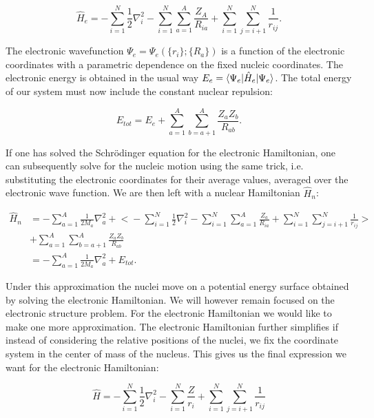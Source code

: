 \begin{equation}
    \hat{H}_e = -\sum_{i=1}^N \frac{1}{2} \nabla_i^2
    -\sum_{i=1}^N \sum_{a=1}^A \frac{Z_A}{R_{ia}}
    +\sum_{i=1}^N \sum_{j=i+1}^N \frac{1}{r_{ij}} .
\end{equation}

The electronic wavefunction $\Psi_e = \Psi_e(\{r_i\}; \{R_a\})$
is a function of the electronic coordinates with a parametric dependence
on the fixed nucleic coordinates. The electronic energy
is obtained in the usual way $E_{e} = \braket{\Psi_e | \hat{H}_e |
\Psi_e} $. The total energy of our system
must now include the constant nuclear repulsion:

\begin{equation}
 E_{tot} = E_{e} + \sum_{a=1}^A \sum_{b=a+1}^A
    \frac{Z_a Z_b}{R_{ab}} . 
\end{equation}

If one has solved the Schr\"{o}dinger equation for the electronic
Hamiltonian, one can subsequently solve for the nucleic motion
using the same trick, i.e. substituting the electronic coordinates
for their average values, averaged over the electronic wave function.
We are then left with a nuclear Hamiltonian $\hat{H}_n$:

\begin{equation}
    \begin{split}
        \hat{H}_n
        &= -\sum_{a=1}^A \frac{1}{2 M_a} \nabla_a^2
        + \biggl< -\sum_{i=1}^N \frac{1}{2} \nabla_i^2
        - \sum_{i=1}^N \sum_{a=1}^A \frac{Z_a}{R_{ia}}
        + \sum_{i=1}^N \sum_{j=i+1}^N \frac{1}{r_{ij}}
        \biggr> \\
        &+ \sum_{a=1}^A \sum_{b=a+1}^A
        \frac{Z_a Z_b}{R_{ab}} \\
        &= -\sum_{a=1}^A \frac{1}{2 M_a} \nabla_a^2
        + E_{tot} .
    \end{split}
\end{equation}

Under this approximation the nuclei move on a potential energy
surface obtained by solving the electronic Hamiltonian.
We will however remain focused on the electronic structure problem.
For the electronic Hamiltonian we would like to make one more
approximation.
The electronic Hamiltonian further simplifies if instead
of considering the relative positions of the nuclei,
we fix the coordinate system in the center of mass of the nucleus.
This gives us the final expression we want for the electronic
Hamiltonian:

\begin{equation}
    \hat{H} = -\sum_{i=1}^N \frac{1}{2} \nabla_i^2
    - \sum_{i=1}^N \frac{Z}{r_{i}} + \sum_{i=1}^N \sum_{j=i+1}^N
    \frac{1}{r_{ij}}
\end{equation}

